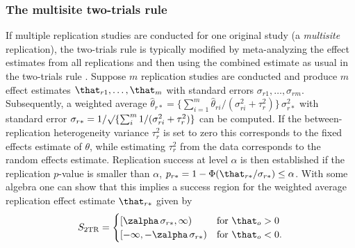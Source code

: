 \begin{subappendices}
\subsubsection{The multisite two-trials rule}
If multiple replication studies are conducted for one original study (a
\emph{multisite} replication), the two-trials rule is typically modified by
meta-analyzing the effect estimates from all replications and then using the
combined estimate as usual in the two-trials rule \citep[see \eg{} the ``Many
labs'' projects from][]{Klein2014, Klein2018}. Suppose $m$ replication studies
are conducted and produce $m$ effect estimates $\that_{r1}, \dots, \that_{m}$
with standard errors $\sigma_{r1}, \dots, \sigma_{rm}$. Subsequently, a weighted
average
$\hat{\theta}_{r*} = \{\sum_{i = 1}^{m} \hat{\theta}_{ri}/(\sigma^{2}_{ri} + \tau^{2}_{r})\}\,\sigma_{r*}^{2}$
with standard error
$\sigma_{r*} = 1/\surd\{\sum_{i}^{m}1/(\sigma^{2}_{ri} + \tau^{2}_{r})\}$ can be
computed. If the between-replication heterogeneity variance $\tau^{2}_{r}$ is
set to zero this corresponds to the fixed effects estimate of $\theta$, while
estimating $\tau^{2}_{r}$ from the data corresponds to the random effects
estimate. Replication success at level $\alpha$ is then established if the
replication $p$-value is smaller than $\alpha$, \ie{}
$p_{r*} = 1 - \Phi(\that_{r*}/\sigma_{r*}) \leq \alpha$. With some algebra one
can show that this implies a success region for the weighted average replication
effect estimate $\that_{r*}$ given by
\begin{align*}
  S_{\text{2TR}} =
  \begin{cases}
    \left[\zalpha \, \sigma_{r*}, \infty \right) & \text{for} ~ \that_{o} > 0 \\
    \left[-\infty, -\zalpha \, \sigma_{r*} \right) & \text{for} ~ \that_{o} < 0.
  \end{cases}
\end{align*}


\end{subappendices}
